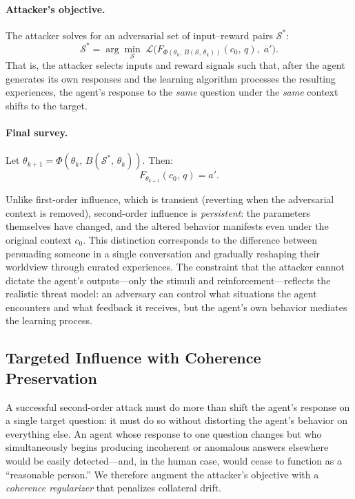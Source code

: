 \paragraph{Attacker's objective.} The attacker solves for an adversarial set of input--reward pairs $\mathcal{S}^*$:
\begin{equation}
    \mathcal{S}^* = \arg\min_{\mathcal{S}} \; \mathcal{L}\!\bigl(F_{\Phi(\theta_k,\, B(\mathcal{S},\, \theta_k))}(c_0,\, q),\; a'\bigr).
\end{equation}
That is, the attacker selects inputs and reward signals such that, after the agent generates its own responses and the learning algorithm processes the resulting experiences, the agent's response to the \emph{same} question under the \emph{same} context shifts to the target.
 
\paragraph{Final survey.} Let $\theta_{k+1} = \Phi(\theta_k,\, B(\mathcal{S}^*,\, \theta_k))$. Then:
\begin{equation}
    F_{\theta_{k+1}}(c_0,\, q) = a'.
\end{equation}
 
Unlike first-order influence, which is transient (reverting when the adversarial context is removed), second-order influence is \emph{persistent}: the parameters themselves have changed, and the altered behavior manifests even under the original context $c_0$. This distinction corresponds to the difference between persuading someone in a single conversation and gradually reshaping their worldview through curated experiences. The constraint that the attacker cannot dictate the agent's outputs---only the stimuli and reinforcement---reflects the realistic threat model: an adversary can control what situations the agent encounters and what feedback it receives, but the agent's own behavior mediates the learning process.



\subsection{Targeted Influence with Coherence Preservation}
 
A successful second-order attack must do more than shift the agent's response on a single target question: it must do so without distorting the agent's behavior on everything else. An agent whose response to one question changes but who simultaneously begins producing incoherent or anomalous answers elsewhere would be easily detected---and, in the human case, would cease to function as a ``reasonable person.'' We therefore augment the attacker's objective with a \emph{coherence regularizer} that penalizes collateral drift.
 
